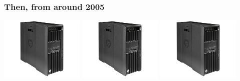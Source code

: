 \documentclass[rgb,dvipsnames]{beamer}
\begin{document}
\begin{frame}
  \frametitle{Then, from around 2005}
  \begin{center}
    \includegraphics[width=0.3\textwidth]{img/hp.jpg}
    \includegraphics[width=0.3\textwidth]{img/hp.jpg}
    \includegraphics[width=0.3\textwidth]{img/hp.jpg}
  \end{center}

\end{frame}
\end{document}
